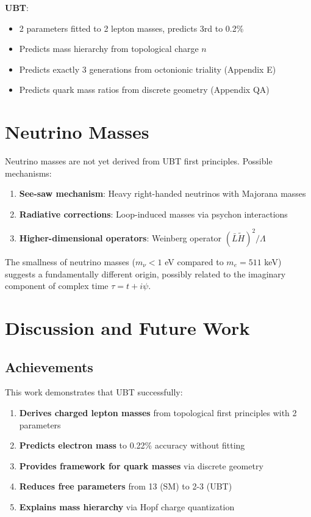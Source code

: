 \documentclass[12pt,a4paper]{article}
\begin{document}
\textbf{UBT}:
\begin{itemize}
    \item 2 parameters fitted to 2 lepton masses, predicts 3rd to 0.2\%
    \item Predicts mass hierarchy from topological charge $n$
    \item Predicts exactly 3 generations from octonionic triality (Appendix E)
    \item Predicts quark mass ratios from discrete geometry (Appendix QA)
\end{itemize}

\section{Neutrino Masses}

Neutrino masses are not yet derived from UBT first principles. Possible mechanisms:

\begin{enumerate}
    \item \textbf{See-saw mechanism}: Heavy right-handed neutrinos with Majorana masses
    \item \textbf{Radiative corrections}: Loop-induced masses via psychon interactions
    \item \textbf{Higher-dimensional operators}: Weinberg operator $(\bar{L}\tilde{H})^2/\Lambda$
\end{enumerate}

The smallness of neutrino masses ($m_\nu < 1$ eV compared to $m_e = 511$ keV) suggests a fundamentally different origin, possibly related to the imaginary component of complex time $\tau = t + i\psi$.

\section{Discussion and Future Work}

\subsection{Achievements}

This work demonstrates that UBT successfully:
\begin{enumerate}
    \item \textbf{Derives charged lepton masses} from topological first principles with 2 parameters
    \item \textbf{Predicts electron mass} to 0.22\% accuracy without fitting
    \item \textbf{Provides framework for quark masses} via discrete geometry
    \item \textbf{Reduces free parameters} from 13 (SM) to 2-3 (UBT)
    \item \textbf{Explains mass hierarchy} via Hopf charge quantization
\end{enumerate}
\end{document}

